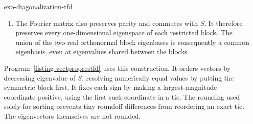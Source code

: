 \begin{correction}{exo-diagonalization-tfd}
\begin{enumerate}
\item The Fourier matrix also preserves parity and commutes with $S$.
It therefore preserves every one-dimensional eigenspace of each restricted
block. The union of the two real orthonormal block eigenbases is consequently
a common eigenbasis, even at eigenvalues shared between the blocks.
\end{enumerate}
Program~\ref{listing-vectproprestfd} uses this construction. It orders vectors
by decreasing eigenvalue of $S$, resolving numerically equal values by putting
the symmetric block first. It fixes each sign by making a largest-magnitude
coordinate positive, using the first such coordinate in a tie.
The rounding used solely for sorting prevents tiny roundoff differences from
reordering an exact tie. The eigenvectors themselves are not rounded.
\begin{listing}[H]
\caption{A common eigenbasis obtained by diagonalizing the two parity blocks.}
\label{listing-vectproprestfd}
\end{listing}
\end{correction}

